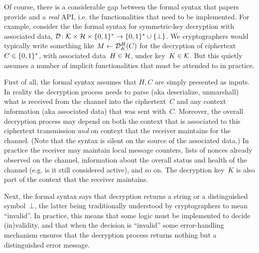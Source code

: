 %
Of course, there is a considerable gap between the formal syntax that papers
provide and a \emph{real} API, i.e. the functionalities that need to be
implemented.  For example, consider the the formal syntax for symmetric-key
decryption with associated data, $\mathcal{D}\colon\mathcal{K} \times \mathcal{H} \times \{0,1\}^*
\to \{0,1\}^* \cup \{\bot\}$.  We cryptographers would typically write something
like $M \gets \mathcal{D}^H_K(C)$ for the decryption of ciphertext~$C\in\{0,1\}^*$, with
associated data~$H \in \mathcal{H}$, under key~$K \in \mathcal{K}$.  But this quietly
assumes a number of implicit functionalities that must be attended to in
practice.

First of all, the formal syntax assumes that $H,C$ are simply presented as
inputs.  In reality the decryption process needs to parse (aka
deserialize, unmarshall) what is received from
the channel into the ciphertext~$C$ and any context information (aka associated
data) that was sent with~$C$.  Moreover, the
overall decryption process may depend on both the context that is associated to
this ciphertext transmission \emph{and} on context that the receiver maintains
for the channel. (Note that the syntax is silent on the source of the associated
data.)  In practice the receiver may maintain local message counters, lists of
nonces already observed on the channel, information about the overall status and
health of the channel (e.g. is it still considered active), and so on.  The
decryption key~$K$ is also part of the context that the receiver maintains.

Next, the formal syntax says that decryption returns a
string or a distinguished symbol~$\bot$, the latter being traditionally
understood by cryptographers to mean ``invalid''.  In practice, this means that
some logic must be implemented to decide (in)validity, and that when the
decision is ``invalid'' some error-handling mechanism ensures that the
decryption process returns nothing but a distinguished error message.

